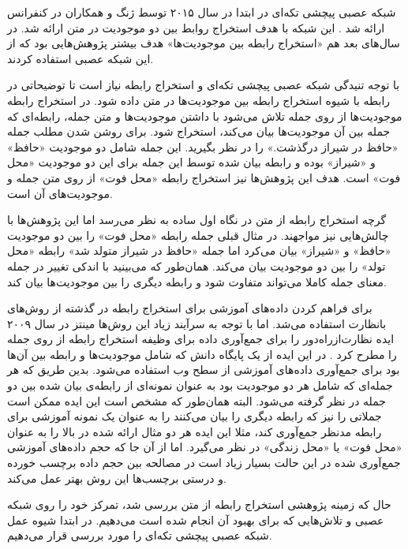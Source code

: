 شبکه عصبی پیچشی تکه‌ای در ابتدا در سال ۲۰۱۵ توسط ژنگ و همکاران در کنفرانس  ارائه شد
\cite{zeng-etal-2015-distant}. این شبکه با هدف استخراج روابط بین دو موجودیت در متن ارائه شد. در سال‌های بعد
هم «استخراج رابطه بین موجودیت‌ها» هدف بیشتر  پژوهش‌هایی بود که از این شبکه عصبی استفاده کردند.

با توجه تنیدگی شبکه عصبی پیچشی تکه‌ای و استخراج رابطه نیاز است تا توضیحاتی در رابطه با
شیوه استخراج رابطه بین موجودیت‌ها در متن داده شود.
در استخراج رابطه موجودیت‌ها از روی جمله تلاش می‌شود با داشتن موجودیت‌ها و متن جمله،
رابطه‌ای که جمله بین آن‌ موجودیت‌ها بیان می‌کند، استخراج شود. برای روشن شدن مطلب جمله «حافظ در شیراز درگذشت.» را
در نظر بگیرید.
این جمله شامل دو موجودیت «حافظ» و «شیراز» بوده و رابطه بیان شده توسط این جمله برای این دو موجودیت «محل فوت» است.
هدف این پژوهش‌ها نیز استخراج رابطه «محل فوت» از روی متن جمله و موجودیت‌های آن است.

گرچه استخراج رابطه از متن در نگاه اول ساده به نظر می‌رسد اما این پژوهش‌ها با چالش‌هایی نیز مواجهند. در مثال قبلی جمله رابطه «محل فوت» را بین دو موجودیت
«حافظ» و «شیراز» بیان می‌کرد اما جمله «حافظ در شیراز متولد شد» رابطه «محل تولد» را بین دو موجودیت بیان می‌کند.
همان‌طور که می‌بینید با اندکی تغییر در جمله معنای جمله کاملا می‌تواند متفاوت شود و رابطه دیگری را بین موجودیت‌ها بیان کند.

برای فراهم کردن داده‌های آموزشی برای استخراج رابطه در گذشته از روش‌های بانظارت استفاده می‌شد. اما با توجه به سرآیند زیاد این
روش‌ها مینتز در سال ۲۰۰۹ ایده نظارت‌ازراه‌دور را برای جمع‌آوری داده برای وظیفه استخراج رابطه از روی جمله را
مطرح کرد \cite{mintz-etal-2009-distant}. در این ایده از یک پایگاه دانش که شامل موجودیت‌ها و رابطه بین آن‌ها بود
برای جمع‌آوری داده‌های آموزشی از سطح وب استفاده می‌شود. بدین طریق که هر جمله‌ای که شامل هر دو موجودیت بود به عنوان
نمونه‌ای از رابطه‌ی بیان شده بین دو جمله در نظر گرفته می‌شود. البته همان‌طور که مشخص است این ایده ممکن است جملاتی را نیز
که رابطه دیگری را بیان می‌کنند را به عنوان یک نمونه آموزشی برای رابطه مدنظر جمع‌آوری کند، مثلا این ایده هر دو مثال
ارائه شده در بالا را به عنوان «محل فوت» یا «محل زندگی» در نظر می‌گیرد.
اما از آن جا که حجم داده‌های آموزشی جمع‌آوری شده در این حالت
بسیار زیاد است در مصالحه بین حجم داده برچسب خورده و درستی برچسب‌ها این روش بهتر عمل می‌کند.

حال که زمینه پژوهشی استخراج رابطه از متن بررسی شد، تمرکز خود را روی شبکه عصبی  و تلاش‌هایی که برای
بهبود آن انجام شده است می‌دهیم. در ابتدا شیوه عمل شبکه عصبی پیچشی تکه‌ای را مورد بررسی قرار می‌دهیم.

